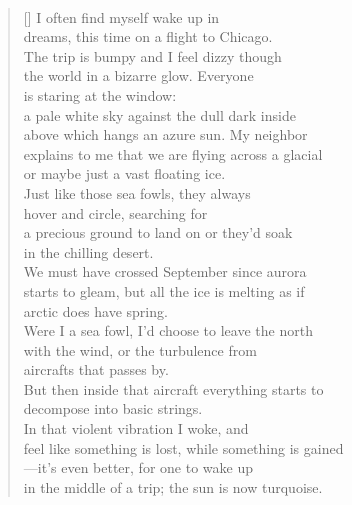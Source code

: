 \documentclass{book}
\begin{document}
\newpage
\poemtitle{\textcolor[RGB]{175,25,25}{Woke}}
\hspace*{\fill} \\
\settowidth{\versewidth}{feel like something is lost, while something is gained}
\begin{verse}[\versewidth]
    I often find myself wake up in \\
    dreams, this time on a flight to Chicago. \\
    The trip is bumpy and I feel dizzy though \\
    the world in a bizarre glow. Everyone \\
    is staring at the window: \\
    a pale white sky against the dull dark inside \\
    above which hangs an azure sun. My neighbor \\
    explains to me that we are flying across a glacial \\
    or maybe just a vast floating ice. \\
    Just like those sea fowls, they always \\
    hover and circle, searching for \\
    a precious ground to land on or they'd soak \\
    in the chilling desert. \\
    We must have crossed September since aurora \\
    starts to gleam, but all the ice is melting as if \\
    arctic does have spring. \\
    Were I a sea fowl, I'd choose to leave the north \\
    with the wind, or the turbulence from \\
    aircrafts that passes by. \\
    But then inside that aircraft everything starts to \\
    decompose into basic strings. \\
    In that violent vibration I woke, and \\
    feel like something is lost, while something is gained \\
    ---it's even better, for one to wake up \\
    in the middle of a trip; the sun is now turquoise. \\
\end{verse}
\end{document}
